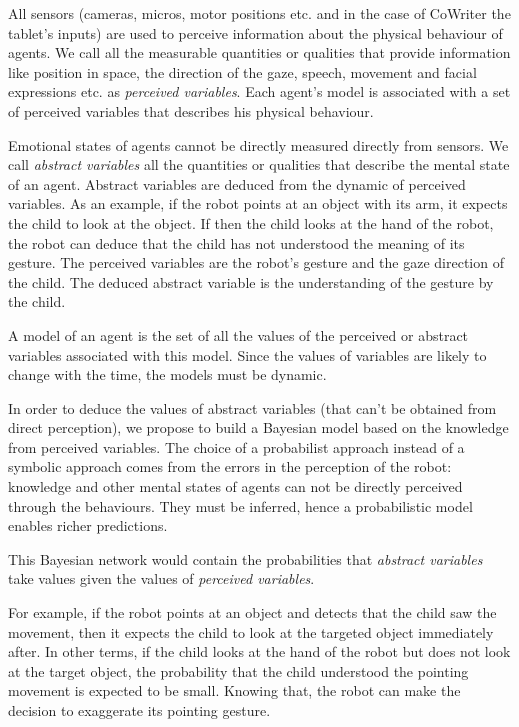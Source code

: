 \documentclass[conference]{IEEEtran}
\begin{document}
All sensors (cameras, micros, motor positions etc. and in the case of CoWriter the tablet's inputs) are used to perceive information about the physical behaviour of agents. 
We call all the measurable quantities or qualities that provide information like position in space, the direction of the gaze, speech, movement and facial expressions etc. as \textit{perceived variables}. 
Each agent's model is associated with a set of perceived variables that describes his physical behaviour.

Emotional states of agents cannot be directly measured directly from sensors. 
We call \textit{abstract variables} all the quantities or qualities that describe the mental state of an agent. 
Abstract variables are deduced from the dynamic of perceived variables. 
As an example, if the robot points at an object with its arm, it expects the child to look at the object. 
If then the child looks at the hand of the robot, the robot can deduce that the child has not understood the meaning of its gesture. 
The perceived variables are the robot's gesture and the gaze direction of the child. 
The deduced abstract variable is the understanding of the gesture by the child. 

A model of an agent is the set of all the values of the perceived or abstract variables associated with this model. 
Since the values of variables are likely to change with the time, the models must be dynamic.


In order to deduce the values of abstract variables (that can't be obtained from direct perception), we propose to build a Bayesian model based on the knowledge from perceived variables. 
The choice of a probabilist approach instead of a symbolic approach comes from the errors in the perception of the robot: knowledge and other mental states of agents can not be directly perceived through the behaviours. 
They must be inferred, hence a probabilistic model enables richer predictions.

This Bayesian network would contain the probabilities that \emph{abstract variables} take values given the values of \emph{perceived variables}. 

For example, if the robot points at an object and detects that the child saw the movement, then it expects the child to look at the targeted object immediately after.
In other terms, if the child looks at the hand of the robot but does not look at the target object, the probability that the child understood the pointing movement is expected to be small.
Knowing that, the robot can make the decision to exaggerate its pointing gesture. 
\end{document}

